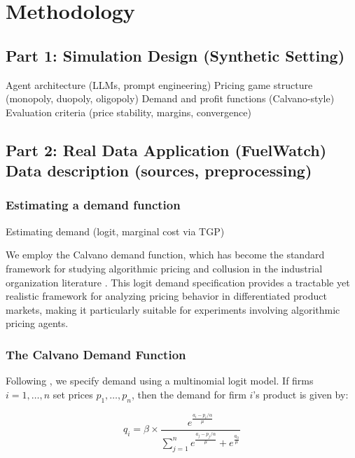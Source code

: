 \section{Methodology}

\subsection{Part 1: Simulation Design (Synthetic Setting)}

Agent architecture (LLMs, prompt engineering)
Pricing game structure (monopoly, duopoly, oligopoly)
Demand and profit functions (Calvano-style)
Evaluation criteria (price stability, margins, convergence)

\subsection{Part 2: Real Data Application (FuelWatch)
Data description (sources, preprocessing)}

\subsubsection*{Estimating a demand function}
Estimating demand (logit, marginal cost via TGP)

We employ the Calvano demand function, which has become the standard framework for studying algorithmic pricing and collusion in the industrial organization literature \parencite{calvano_artificial_2020, fish_algorithmic_2025}. This logit demand specification provides a tractable yet realistic framework for analyzing pricing behavior in differentiated product markets, making it particularly suitable for experiments involving algorithmic pricing agents.

\subsubsection*{The Calvano Demand Function}

Following \textcite{calvano_artificial_2020, fish_algorithmic_2025}, we specify demand using a multinomial logit model. If firms $i = 1, \ldots, n$ set prices $p_1, \ldots, p_n$, then the demand for firm $i$'s product is given by:

\begin{equation}
    q_i = \beta \times \frac{e^{\frac{a_i - p_i/\alpha}{\mu}}}{\sum_{j=1}^{n} e^{\frac{a_j - p_j/\alpha}{\mu}} + e^{\frac{a_0}{\mu}}}
\end{equation}

